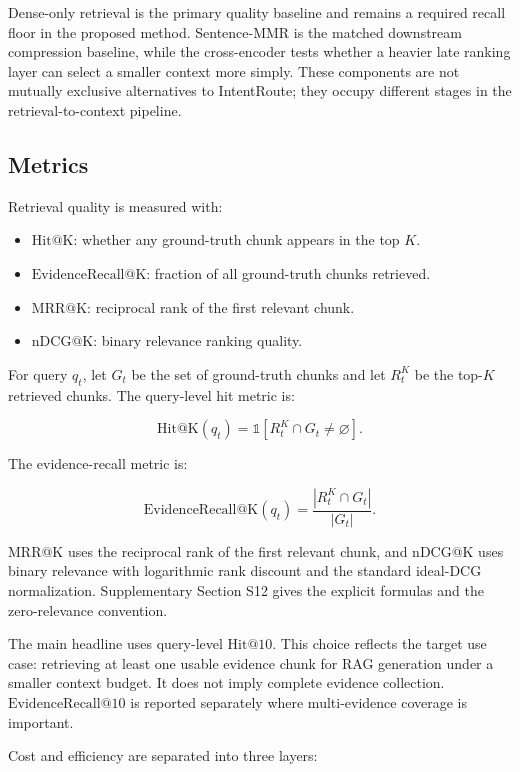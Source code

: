 Dense-only retrieval is the primary quality baseline and remains a required recall floor in the proposed method. Sentence-MMR is the matched downstream compression baseline, while the cross-encoder tests whether a heavier late ranking layer can select a smaller context more simply. These components are not mutually exclusive alternatives to IntentRoute; they occupy different stages in the retrieval-to-context pipeline.

\subsection{Metrics}
\label{sec:05-experimental-setup:metrics}

Retrieval quality is measured with:

\begin{itemize}
\item $\mathrm{Hit@K}$: whether any ground-truth chunk appears in the top $K$.
\item $\mathrm{EvidenceRecall@K}$: fraction of all ground-truth chunks retrieved.
\item $\mathrm{MRR@K}$: reciprocal rank of the first relevant chunk.
\item $\mathrm{nDCG@K}$: binary relevance ranking quality.
\end{itemize}

For query $q_t$, let $G_t$ be the set of ground-truth chunks and let $R_t^K$ be the top-$K$ retrieved chunks. The query-level hit metric is:

\[
\mathrm{Hit@K}(q_t) =
\mathbb{1}\left[ R_t^K \cap G_t \neq \varnothing \right].
\]

The evidence-recall metric is:

\[
\mathrm{EvidenceRecall@K}(q_t) =
\frac{\left| R_t^K \cap G_t \right|}{\left|G_t\right|}.
\]

MRR@K uses the reciprocal rank of the first relevant chunk, and nDCG@K uses binary relevance with logarithmic rank discount and the standard ideal-DCG normalization. Supplementary Section S12 gives the explicit formulas and the zero-relevance convention.

The main headline uses query-level $\mathrm{Hit@10}$. This choice reflects the target use case: retrieving at least one usable evidence chunk for RAG generation under a smaller context budget. It does not imply complete evidence collection. $\mathrm{EvidenceRecall@10}$ is reported separately where multi-evidence coverage is important.

Cost and efficiency are separated into three layers:


